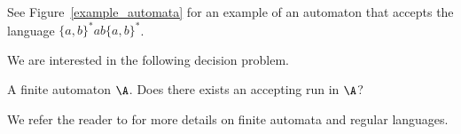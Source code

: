 \begin{example}
	See Figure~\ref{example_automata} for an example of an automaton that accepts the language $\{a,b\}^*ab\{a,b\}^* $.
\end{example}

We are interested in the following decision problem.

{A finite automaton $\A$.}
{Does 
there exists an accepting run in
 $\A$?\newline}


We refer the reader to \cite{Har78} for more details on
 finite automata and regular languages. \newpage











